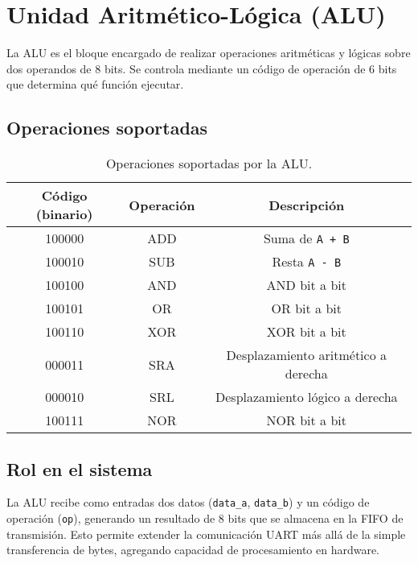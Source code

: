 \section{Unidad Aritmético-Lógica (ALU)}

La ALU es el bloque encargado de realizar operaciones aritméticas y lógicas sobre dos operandos de 8 bits.  
Se controla mediante un código de operación de 6 bits que determina qué función ejecutar.  

\subsection{Operaciones soportadas}
\begin{table}[H]
    \centering
    \begin{tabular}{|c|c|c|}
        \hline
        Código (binario) & Operación & Descripción \\ \hline
        100000 & ADD & Suma de \texttt{A + B} \\
        100010 & SUB & Resta \texttt{A - B} \\
        100100 & AND & AND bit a bit \\
        100101 & OR  & OR bit a bit \\
        100110 & XOR & XOR bit a bit \\
        000011 & SRA & Desplazamiento aritmético a derecha \\
        000010 & SRL & Desplazamiento lógico a derecha \\
        100111 & NOR & NOR bit a bit \\ \hline
    \end{tabular}
    \caption{Operaciones soportadas por la ALU.}
    \label{tab:alu-ops}
\end{table}

\subsection{Rol en el sistema}
La ALU recibe como entradas dos datos (\texttt{data\_a}, \texttt{data\_b}) y un código de operación (\texttt{op}), generando un resultado de 8 bits que se almacena en la FIFO de transmisión.  
Esto permite extender la comunicación UART más allá de la simple transferencia de bytes, agregando capacidad de procesamiento en hardware.
